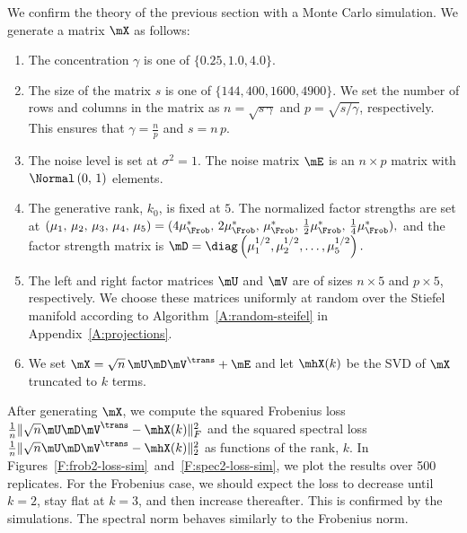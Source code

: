We confirm the theory of the previous section with a Monte Carlo simulation.  We generate a matrix $\mX$ as follows:
\begin{enumerate}
    \item The concentration $\gamma$ is one of $\{ 0.25, 1.0, 4.0 \}$.
    \item The size of the matrix $s$ is one of $\{ 144, 400, 1600, 4900 \}$.
        We set the number of rows and columns in the matrix as
        $n = \sqrt{ s \, \gamma }$ and $p = \sqrt{s / \gamma}$, respectively.
        This ensures that $\gamma = \frac{n}{p}$ and $s = n \, p$.
    \item The noise level is set at $\sigma^2 = 1$.  The noise matrix $\mE$
        is an $n \times p$ matrix with \iid $\Normal\left( 0, \, 1\right)$
        elements.
    \item The generative rank, $k_0$, is fixed at $5$.  The normalized
        factor strengths are set at
        \(
            (
                \mu_1, \,
                \mu_2, \,
                \mu_3, \,
                \mu_4, \,
                \mu_5
            )
            =
            (
                4 \mu_\Frob^\ast, \,
                2 \mu_\Frob^\ast, \,
                  \mu_\Frob^\ast, \,
                \frac{1}{2} \mu_\Frob^\ast, \,
                \frac{1}{4} \mu_\Frob^\ast
            ),
        \)
        and the factor strength matrix is
        \(
            \mD 
            = 
            \diag\left( 
                \mu_1^{1/2},
                \mu_2^{1/2},
                \ldots, 
                \mu_5^{1/2}
            \right).
        \)
    \item The left and right factor matrices $\mU$ and $\mV$ are of sizes
        $n \times 5$ and $p \times 5$, respectively.  We choose these matrices
        uniformly at random over the Stiefel manifold according
        to Algorithm~\ref{A:random-steifel} in Appendix~\ref{A:projections}.
    \item We set $\mX = \sqrt{n} \, \mU \mD \mV^\trans + \mE$ and let
        $\mhX(k)$ be the SVD of $\mX$ truncated to $k$ terms.
\end{enumerate}
After generating $\mX$, we compute the squared Frobenius loss
\(
    \frac{1}{n} \| \sqrt{n}\mU \mD \mV^\trans - \mhX(k) \|_F^2
\)
and the squared spectral loss
\(
    \frac{1}{n} \| \sqrt{n}\mU \mD \mV^\trans - \mhX(k) \|_2^2
\)
as functions of the rank, $k$.  In 
Figures~\ref{F:frob2-loss-sim}~and~\ref{F:spec2-loss-sim}, we plot the results 
over 500 replicates.  For the Frobenius case, we should expect the loss to
decrease until $k=2$, stay flat at $k=3$, and then increase thereafter.  This 
is confirmed by the simulations.  The spectral norm behaves similarly to the 
Frobenius norm.


